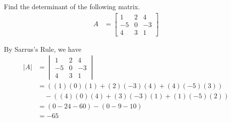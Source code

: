 \begin{exmp}
Find the determinant of the following matrix.
\begin{align*}
A &=
\begin{bmatrix}
1 & 2 & 4 \\
-5 & 0 & -3 \\
4 & 3 & 1
\end{bmatrix} 
\end{align*}
\end{exmp}
\begin{solution}
By Sarrus's Rule, we have
\begin{align*}
|A| &=
\begin{vmatrix}
1 & 2 & 4 \\
-5 & 0 & -3 \\
4 & 3 & 1
\end{vmatrix} \\
&= ((1)(0)(1) + (2)(-3)(4) + (4)(-5)(3)) \\
&\quad- ((4)(0)(4) + (3)(-3)(1) + (1)(-5)(2)) \\
&= (0 - 24 - 60) - (0 - 9 - 10) \\
&= -65
\end{align*}
\end{solution}

